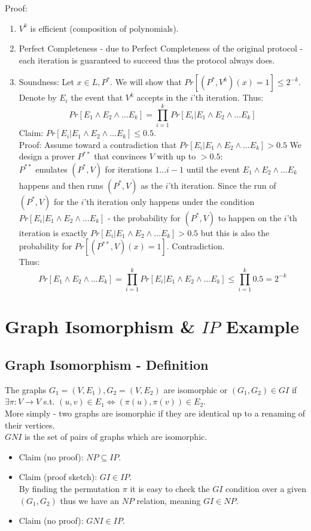 Proof:
\begin{enumerate}
    \item $V^k$ is efficient  (composition of polynomials).
    \item Perfect Completeness - due to Perfect  Completeness of the original protocol - each iteration is guaranteed to succeed thus the protocol always does.
    \item Soundness: Let $x\in L, P^*$. We will show that $Pr[(P^*, V^k)(x)=1]\leq 2^{-k}$.
    Denote by $E_i$ the event that $V^k$ accepts in the $i$'th iteration. Thus:
    \[
        Pr[E_1\wedge E_2\wedge\dots E_k]=\prod_{i=1}^kPr[E_i|E_1\wedge E_2\wedge\dots E_k]
    \]
    Claim: $Pr[E_i|E_1\wedge E_2\wedge\dots E_k]\leq 0.5$.\\
    Proof: Assume toward a contradiction that $Pr[E_i|E_1\wedge E_2\wedge\dots E_k]>0.5$
    We design a prover $P^{**}$ that convinces $V$ with up to $>0.5$:\\
    $P^{**}$ emulates $(P^*, V)$ for iterations $1...i-1$ until the event $E_1\wedge E_2\wedge\dots E_k$ happens and then runs $(P^*,V)$ as the $i$'th iteration. Since the run of $(P^*,V)$ for the $i$'th iteration only happens under the condition $Pr[E_i|E_1\wedge E_2\wedge\dots E_k]$ - the probability for $(P^*,V)$ to happen on the $i$'th iteration is exactly $Pr[E_i|E_1\wedge E_2\wedge\dots E_k]>0.5$ but this is also the probability for $Pr[(P^{**},V)(x)=1]$. Contradiction.\\
    
    Thus:
    \[
        Pr[E_1\wedge E_2\wedge\dots E_k]=\prod_{i=1}^kPr[E_i|E_1\wedge E_2\wedge\dots E_k]\leq \prod_{i=1}^k0.5=2^{-k}
    \]
\end{enumerate}

\section*{Graph Isomorphism \& $IP$ Example}
\subsection*{Graph Isomorphism - Definition}
The graphs $G_1=(V,E_1), G_2=(V,E_2)$ are isomorphic or $(G_1,G_2)\in GI$ if $\exists\pi:V\longrightarrow V$ s.t. $(u,v)\in E_1 \iff (\pi(u), \pi(v))\in E_2$.\\
More simply - two graphs are isomorphic if they are identical up to a renaming of their vertices.\\

$GNI$ is the set of pairs of graphs which are isomorphic.\\
\begin{itemize}
    \item Claim (no proof): $NP\subseteq IP$.\\
    \item Claim (proof sketch): $GI\in IP$.\\
    By finding the permutation $\pi$ it is easy to check the $GI$ condition over a given $(G_1,G_2)$ thus we have an $NP$ relation, meaning $GI\in NP$.\\
    \item Claim (no proof): $GNI\in IP$.
\end{itemize}